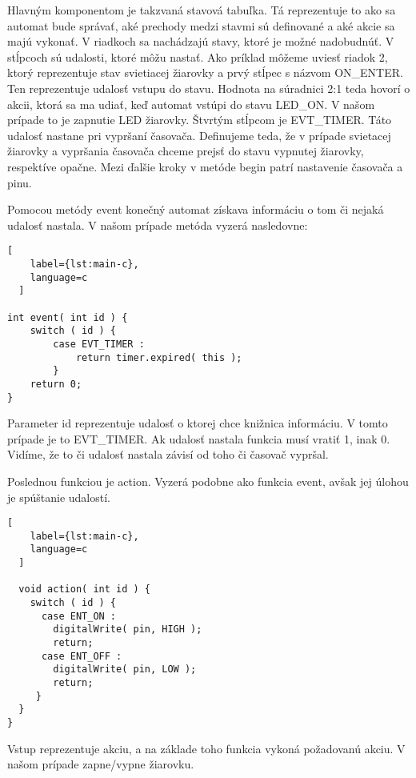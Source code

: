 Hlavným komponentom je takzvaná stavová tabuľka. Tá reprezentuje to ako sa automat bude správať, aké prechody medzi stavmi sú definované a aké akcie sa majú vykonať. V riadkoch sa nachádzajú stavy, ktoré je možné nadobudnúť. V stĺpcoch sú udalosti, ktoré môžu nastať. Ako príklad môžeme uviesť riadok 2, ktorý reprezentuje stav svietiacej žiarovky a prvý stĺpec s názvom ON\_ENTER. Ten reprezentuje udalosť vstupu do stavu. Hodnota na súradnici 2:1 teda hovorí o  akcii, ktorá sa ma udiať, keď automat vstúpi do stavu LED\_ON. V našom prípade to je zapnutie LED žiarovky. Štvrtým stĺpcom je EVT\_TIMER. Táto udalosť nastane pri vypršaní časovača. Definujeme teda, že v prípade svietacej žiarovky a vypršania časovača chceme prejsť do stavu vypnutej žiarovky, respektíve opačne.  Mezi ďalšie kroky v metóde begin patrí nastavenie časovača a pinu.
\par Pomocou metódy event konečný automat získava informáciu o tom či nejaká udalosť nastala. V našom prípade metóda vyzerá nasledovne:
\begin{lstlisting}[
    label={lst:main-c},
    language=c
  ]

int event( int id ) {
    switch ( id ) {
        case EVT_TIMER :
            return timer.expired( this );        
        }
    return 0;
}
\end{lstlisting}
Parameter id reprezentuje udalosť o ktorej chce knižnica informáciu. V tomto prípade je to EVT\_TIMER. Ak udalosť nastala funkcia musí vratiť 1, inak 0. Vidíme, že to či udalosť nastala závisí od toho či časovač vypršal. 
\par Poslednou funkciou je action. Vyzerá podobne ako funkcia event, avšak jej úlohou je spúštanie udalostí. 
\begin{lstlisting}[
    label={lst:main-c},
    language=c
  ]

  void action( int id ) {
    switch ( id ) {
      case ENT_ON :
        digitalWrite( pin, HIGH );
        return;
      case ENT_OFF :
        digitalWrite( pin, LOW );
        return;
     }
  }
}
\end{lstlisting}
Vstup reprezentuje akciu, a na základe toho funkcia vykoná požadovanú akciu. V našom prípade zapne/vypne žiarovku.

